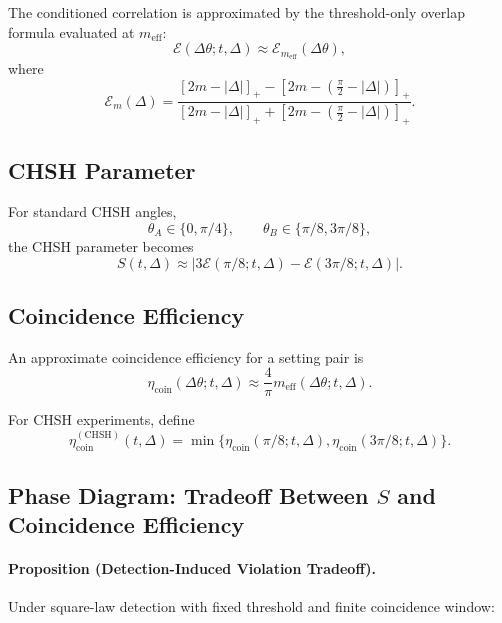 The conditioned correlation is approximated by the threshold-only overlap formula evaluated at $m_{\mathrm{eff}}$:
\begin{equation}
\boxed{
\mathcal{E}(\Delta\theta; t,\Delta)
\approx
\mathcal{E}_{m_{\mathrm{eff}}}(\Delta\theta),
}
\end{equation}
where
\begin{equation}
\mathcal{E}_{m}(\Delta)
=
\frac{
[2m-|\Delta|]_+
-
[2m-(\frac{\pi}{2}-|\Delta|)]_+
}{
[2m-|\Delta|]_+
+
[2m-(\frac{\pi}{2}-|\Delta|)]_+
}.
\end{equation}

\subsection{CHSH Parameter}

For standard CHSH angles,
\begin{equation}
\theta_A \in \{0,\pi/4\},
\qquad
\theta_B \in \{\pi/8, 3\pi/8\},
\end{equation}
the CHSH parameter becomes
\begin{equation}
\boxed{
S(t,\Delta)
\approx
\left|
3\mathcal{E}(\pi/8; t,\Delta)
-
\mathcal{E}(3\pi/8; t,\Delta)
\right|.
}
\end{equation}

\subsection{Coincidence Efficiency}

An approximate coincidence efficiency for a setting pair is
\begin{equation}
\boxed{
\eta_{\mathrm{coin}}(\Delta\theta; t,\Delta)
\approx
\frac{4}{\pi} m_{\mathrm{eff}}(\Delta\theta; t,\Delta).
}
\end{equation}

For CHSH experiments, define
\begin{equation}
\boxed{
\eta_{\mathrm{coin}}^{\mathrm{(CHSH)}}(t,\Delta)
=
\min\{
\eta_{\mathrm{coin}}(\pi/8; t,\Delta),
\eta_{\mathrm{coin}}(3\pi/8; t,\Delta)
\}.
}
\end{equation}

\subsection{Phase Diagram: Tradeoff Between $S$ and Coincidence Efficiency}

\paragraph{Proposition (Detection-Induced Violation Tradeoff).}
Under square-law detection with fixed threshold and finite coincidence window:

